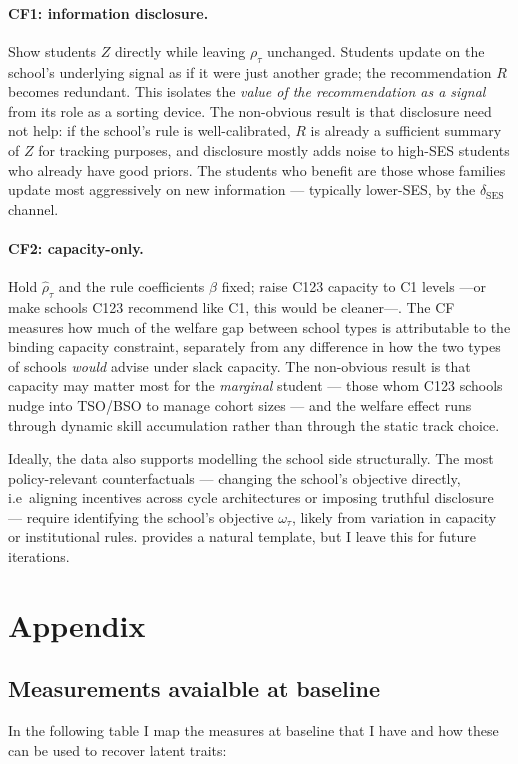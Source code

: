 \documentclass{article}
\begin{document}
\paragraph{CF1: information disclosure.} Show students $Z$ directly while leaving $\rho_\tau$ unchanged. Students update on the school's underlying signal as if it were just another grade; the recommendation $R$ becomes redundant. This isolates the \emph{value of the recommendation as a signal} from its role as a sorting device. The non-obvious result is that disclosure need not help: if the school's rule is well-calibrated, $R$ is already a sufficient summary of $Z$ for tracking purposes, and disclosure mostly adds noise to high-SES students who already have good priors. The students who benefit are those whose families update most aggressively on new information --- typically lower-SES, by the $\delta_{\mathrm{SES}}$ channel.

\paragraph{CF2: capacity-only.} Hold $\hat\rho_\tau$ and the rule coefficients $\beta$ fixed; raise C123 capacity to C1 levels ---or make schools C123 recommend like C1, this would be cleaner---. The CF measures how much of the welfare gap between school types is attributable to the binding capacity constraint, separately from any difference in how the two types of schools \emph{would} advise under slack capacity. The non-obvious result is that capacity may matter most for the \emph{marginal} student --- those whom C123 schools nudge into TSO/BSO to manage cohort sizes --- and the welfare effect runs through dynamic skill accumulation rather than through the static track choice.

Ideally, the data also supports modelling the school side structurally. The 
most policy-relevant counterfactuals --- changing the school's objective 
directly, i.e\ aligning incentives across cycle architectures or imposing 
truthful disclosure --- require identifying the school's objective $\omega_\tau$, likely from variation in capacity or institutional rules. \citet{fu_mehta} provides 
a natural template, but I leave this for future iterations.

\section*{Appendix}


\subsection{Measurements avaialble at baseline}
In the following table I map the measures at baseline that I have and how these can be used to recover latent traits:
\end{document}
